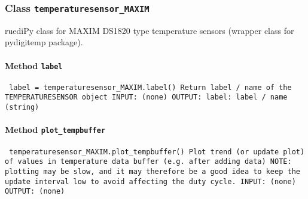 \subsubsection{Class \texttt{temperaturesensor_MAXIM}}
\par
ruediPy class for MAXIM DS1820 type temperature sensors (wrapper class for pydigitemp package).\par

\paragraph{Method \texttt{label}}
\vspace{1ex}
\texttt{\newline
label = temperaturesensor_MAXIM.label()\newline
\newline
Return label / name of the TEMPERATURESENSOR object\newline
\newline
INPUT:\newline
(none)\newline
\newline
OUTPUT:\newline
label: label / name (string)\newline
\newline
}

\paragraph{Method \texttt{plot_tempbuffer}}
\vspace{1ex}
\texttt{\newline
temperaturesensor_MAXIM.plot_tempbuffer()\newline
\newline
Plot trend (or update plot) of values in temperature data buffer (e.g. after adding data)\newline
NOTE: plotting may be slow, and it may therefore be a good idea to keep the update interval low to avoid affecting the duty cycle.\newline
\newline
INPUT:\newline
(none)\newline
\newline
OUTPUT:\newline
(none)\newline
\newline
}

